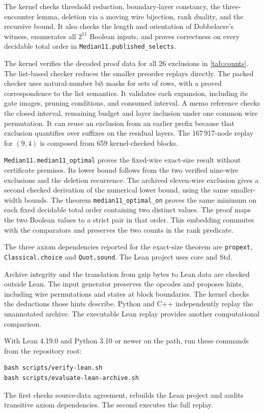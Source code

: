 The kernel checks threshold reduction, boundary-layer constancy, the
three-encounter lemma, deletion via a moving wire bijection, rank
duality, and the recursive bound. It also checks the length and
orientation of Dobbelaere's witness, enumerates all $2^{11}$ Boolean
inputs, and proves correctness on every decidable total order in
\texttt{Median11.published\_selects}.

The kernel verifies the decoded proof data for all 26 exclusions in
\cref{tab:counts}. The list-based checker reduces the smaller preorder
replays directly. The packed checker uses natural-number bit masks for
sets of rows, with a proved correspondence to the list semantics. It
validates each expansion, including its gate images, pruning conditions,
and consumed interval. A memo reference checks the closed interval,
remaining budget and layer inclusion under one common wire permutation.
It can reuse an exclusion from an earlier prefix because that exclusion
quantifies over suffixes on the residual layers. The 167\,917-node
replay for $(9,4)$ is composed from 659 kernel-checked blocks.

\texttt{Median11.median11\_optimal} proves the fixed-wire exact-size
result without certificate premises. Its lower bound follows from
the two verified nine-wire exclusions and the deletion recurrence.
The archived eleven-wire exclusion gives a second checked derivation
of the numerical lower bound, using the same smaller-width bounds.
The theorem \texttt{median11\_optimal\_on} proves the same
minimum on each fixed decidable total order containing two distinct
values. The proof maps the two Boolean values to a strict pair in that
order. This embedding commutes with the comparators and preserves the
two counts in the rank predicate.

The three axiom dependencies reported for the exact-size theorem are
\texttt{propext}, \texttt{Classical.choice} and \texttt{Quot.sound}.
The Lean project uses core and Std.

Archive integrity and the translation from gzip bytes to Lean data
are checked outside Lean. The input generator preserves the opcodes
and proposes hints, including wire permutations and states at block
boundaries. The kernel checks the deductions those hints describe.
Python and C++ independently replay the unannotated archive. The
executable Lean replay provides another computational comparison.

With Lean 4.19.0 and Python 3.10 or newer on the path, run these commands
from the repository root:
\begin{verbatim}
bash scripts/verify-lean.sh
bash scripts/evaluate-lean-archive.sh
\end{verbatim}
The first checks source-data agreement, rebuilds the Lean project and
audits transitive axiom dependencies. The second executes the full replay.

